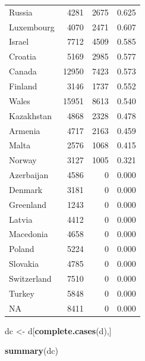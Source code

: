 \documentclass[
]{article}
\newenvironment{Shaded}{\begin{snugshade}}{\end{snugshade}}
\newcommand{\FunctionTok}[1]{\textcolor[rgb]{0.13,0.29,0.53}{\textbf{#1}}}
\newcommand{\NormalTok}[1]{#1}
\newcommand{\OtherTok}[1]{\textcolor[rgb]{0.56,0.35,0.01}{#1}}
\begin{document}
\begin{longtable}[]{@{}lrrr@{}}
Russia & 4281 & 2675 & 0.625 \\
Luxembourg & 4070 & 2471 & 0.607 \\
Israel & 7712 & 4509 & 0.585 \\
Croatia & 5169 & 2985 & 0.577 \\
Canada & 12950 & 7423 & 0.573 \\
Finland & 3146 & 1737 & 0.552 \\
Wales & 15951 & 8613 & 0.540 \\
Kazakhstan & 4868 & 2328 & 0.478 \\
Armenia & 4717 & 2163 & 0.459 \\
Malta & 2576 & 1068 & 0.415 \\
Norway & 3127 & 1005 & 0.321 \\
Azerbaijan & 4586 & 0 & 0.000 \\
Denmark & 3181 & 0 & 0.000 \\
Greenland & 1243 & 0 & 0.000 \\
Latvia & 4412 & 0 & 0.000 \\
Macedonia & 4658 & 0 & 0.000 \\
Poland & 5224 & 0 & 0.000 \\
Slovakia & 4785 & 0 & 0.000 \\
Switzerland & 7510 & 0 & 0.000 \\
Turkey & 5848 & 0 & 0.000 \\
NA & 8411 & 0 & 0.000 \\
\end{longtable}

\begin{Shaded}
\begin{Highlighting}[]
\NormalTok{dc }\OtherTok{\textless{}{-}}\NormalTok{ d[}\FunctionTok{complete.cases}\NormalTok{(d),]}

\FunctionTok{summary}\NormalTok{(dc)}
\end{Highlighting}
\end{Shaded}
\end{document}
